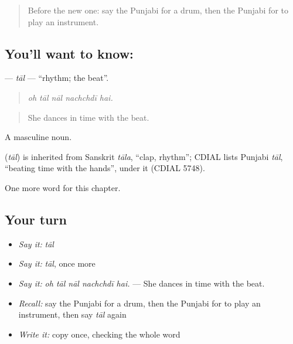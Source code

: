 \begin{quote}
Before the new one: say the Punjabi for a drum, then the Punjabi for to play an instrument.
\end{quote}

\subsection*{You'll want to know: }
\textbf{} — \emph{tāl} — \textquotedblleft{}rhythm; the beat\textquotedblright{}.

\begin{quote}
    
\end{quote}

\begin{quote}
\emph{oh tāl nāl nachchdī hai.}
\end{quote}

\begin{quote}
She dances in time with the beat.
\end{quote}

A masculine noun.

\begin{cousinweb}
\textbf{} (\emph{tāl}) is inherited from Sanskrit \emph{tāla}, \textquotedblleft{}clap, rhythm\textquotedblright{}; CDIAL lists Punjabi \emph{tāl}, \textquotedblleft{}beating time with the hands\textquotedblright{}, under it (CDIAL 5748).
\end{cousinweb}

\begin{grammarlens}[title={What you've built}]
One more word for this chapter.
\end{grammarlens}

\subsection*{Your turn}
\begin{itemize}
\raggedright
  \item \emph{Say it:} \emph{tāl}
  \item \emph{Say it:} \emph{tāl}, once more
  \item \emph{Say it:} \emph{oh tāl nāl nachchdī hai.} — She dances in time with the beat.
  \item \emph{Recall:} say the Punjabi for a drum, then the Punjabi for to play an instrument, then say \emph{tāl} again
  \item \emph{Write it:} copy \textbf{} once, checking the whole word
\end{itemize}

